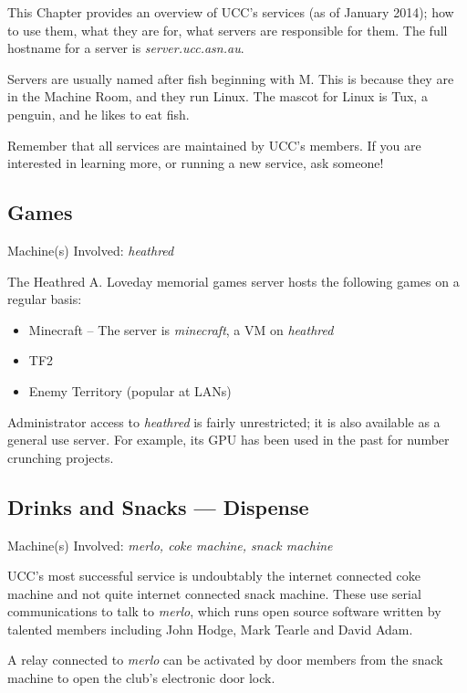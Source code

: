 
\newcommand{\server}[1]{\emph{#1}}

\begin{mdframed}
\null
This Chapter provides an overview of UCC's services (as of January 2014); how to use them, what they are for, what servers are responsible for them. The full hostname for a server is \server{server.ucc.asn.au}.

 Servers are usually named after fish beginning with M. This is because they are in the Machine Room, and they run Linux. The mascot for Linux is Tux, a penguin, and he likes to eat fish.


Remember that all services are maintained by UCC's members. If you are interested in learning more, or running a new service, ask someone!


\end{mdframed}

\newenvironment{uccservice}[2]
{
	\begin{mdframed}
	\section{#1}
	\begin{mdframed}
		Machine(s) Involved: \server{#2}
	\end{mdframed}

	
}{\end{mdframed}}

\begin{uccservice}{Games}{heathred}

The Heathred A. Loveday memorial games server hosts the following games on a regular basis:
\begin{itemize}
	\item Minecraft -- The server is \server{minecraft}, a VM on \server{heathred}
	\item TF2
	\item Enemy Territory (popular at LANs)
\end{itemize}


Administrator access to \server{heathred} is fairly unrestricted; it is also available as a general use server. For example, its GPU has been used in the past for number crunching projects.

\end{uccservice}

\pagebreak

\begin{uccservice}{Drinks and Snacks --- Dispense}{merlo, coke machine, snack machine}

UCC's most successful service is undoubtably the internet connected coke machine and not quite internet connected snack machine. These use serial communications to talk to \server{merlo}, which runs open source software written by talented members including John Hodge, Mark Tearle and David Adam. 

A relay connected to \server{merlo} can be activated by door members from the snack machine to open the club's electronic door lock.

\end{uccservice}



